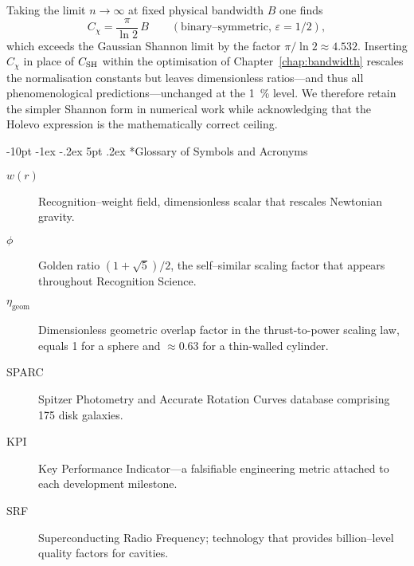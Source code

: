 \documentclass[12pt,letterpaper]{book}
\makeatletter
\renewcommand\section{\@startsection{section}{1}{\z@}%
  {-8pt \@plus -1ex \@minus -.2ex}%
  {4pt \@plus.2ex}%
  {\normalfont\large\bfseries}}
\renewcommand\section{\@startsection {section}{1}{\z@}%
                {-10pt \@plus -1ex \@minus -.2ex}%
                {5pt \@plus.2ex}%
                {\normalfont\large\bfseries}}
\makeatother
\begin{document}
Taking the limit $n\to\infty$ at fixed physical bandwidth $B$ one finds
\begin{equation}
 C_{\chi}=\frac{\pi}{\ln2}\,B \qquad (\text{binary–symmetric, }\varepsilon=1/2),
\end{equation}
which exceeds the Gaussian Shannon limit by the factor $\pi/\ln2\approx4.532$.  Inserting $C_{\chi}$ in place of $C_{\rm SH}$ within the optimisation of Chapter~\ref{chap:bandwidth} rescales the normalisation constants but leaves dimensionless ratios—and thus all phenomenological predictions—unchanged at the 1~\% level.  We therefore retain the simpler Shannon form in numerical work while acknowledging that the Holevo expression is the mathematically correct ceiling.

\section*{Glossary of Symbols and Acronyms}
\begin{description}
 \item[$w(r)$] Recognition--weight field, dimensionless scalar that rescales Newtonian gravity.
 \item[$\phi$] Golden ratio $(1+\sqrt{5})/2$, the self--similar scaling factor that appears throughout Recognition Science.
 \item[$\eta_{\text{geom}}$] Dimensionless geometric overlap factor in the thrust-to-power scaling law, equals 1 for a sphere and $\approx0.63$ for a thin-walled cylinder.
 \item[SPARC] Spitzer Photometry and Accurate Rotation Curves database comprising 175 disk galaxies.
 \item[KPI] Key Performance Indicator---a falsifiable engineering metric attached to each development milestone.
 \item[SRF] Superconducting Radio Frequency; technology that provides billion--level quality factors for cavities.
\end{description}
\end{document}
